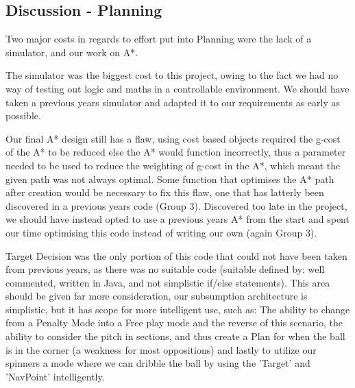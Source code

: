\subsection{Discussion - Planning}


Two major costs in regards to effort put into Planning were the lack of a 
simulator, and our work on A*. 

The simulator was the biggest cost to this project, owing to the fact we had
no way of testing out logic and maths in a controllable environment. We should
have taken a previous years simulator and adapted it to our requirements as
early as possible. 

Our final A* design still has a flaw, using cost based objects required the 
g-cost of the A* to be reduced else the A* would function incorrectly, thus a 
parameter needed to be used to reduce the weighting of g-cost in the A*, which 
meant the given path was not always optimal. Some function that optimises the A* 
path after creation would be necessary to fix this flaw, one that has latterly 
been discovered in a previous years code (Group 3). Discovered too late 
in the project, we should have instead opted to use a previous years A* from the 
start and spent our time optimising this code instead of writing our own 
(again Group 3).

Target Decision was the only portion of this code that could not have been 
taken from previous years, as there was no suitable code (suitable defined by:
well commented, written in Java, and not simplistic if/else statements). This 
area should be given far more consideration, our subsumption architecture is
simplistic, but it has scope for more intelligent use, such as: The ability to
change from a Penalty Mode into a Free play mode and the reverse of this 
scenario, the ability to consider the pitch in sections, and thus create a Plan
for when the ball is in the corner (a weakness for most oppositions) and lastly 
to utilize our spinners a mode where we can dribble the ball by using the 
'Target' and 'NavPoint' intelligently.


